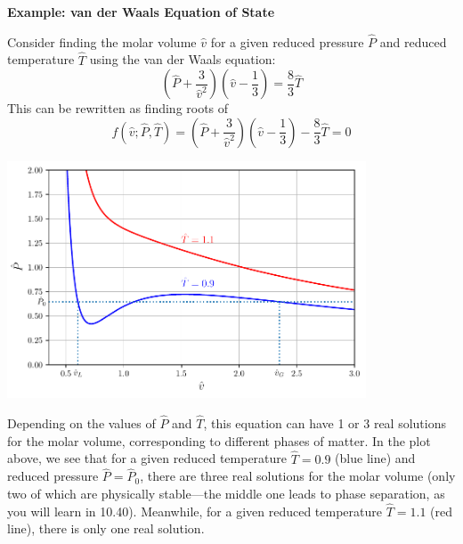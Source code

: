 \begin{exampleBox}
\textbf{Example: van der Waals Equation of State}

Consider finding the molar volume $\hat{v}$ for a given reduced pressure $\hat{P}$ and reduced temperature $\hat{T}$ using the van der Waals equation:
\begin{equation}
\left(\hat{P} + \frac{3}{\hat{v}^2}\right)\left(\hat{v} - \frac{1}{3}\right) = \frac{8}{3}\hat{T}
\end{equation}
This can be rewritten as finding roots of
\begin{equation}
f(\hat{v}; \hat{P}, \hat{T}) = \left(\hat{P} + \frac{3}{\hat{v}^2}\right)\left(\hat{v} - \frac{1}{3}\right) - \frac{8}{3}\hat{T} = 0
\end{equation}

\begin{center}
\includegraphics[width=0.8\textwidth]{figs/nle/vdw_eos.pdf}
\end{center}

Depending on the values of $\hat{P}$ and $\hat{T}$, this equation can have 1 or 3 real solutions for the molar volume, corresponding to different phases of matter. In the plot above, we see that for a given reduced temperature $\hat{T} = 0.9$ (blue line) and reduced pressure $\hat{P} = \hat{P}_0$, there are three real solutions for the molar volume (only two of which are physically stable---the middle one leads to phase separation, as you will learn in 10.40). Meanwhile, for a given reduced temperature $\hat{T} = 1.1$ (red line), there is only one real solution.
\end{exampleBox}
    
